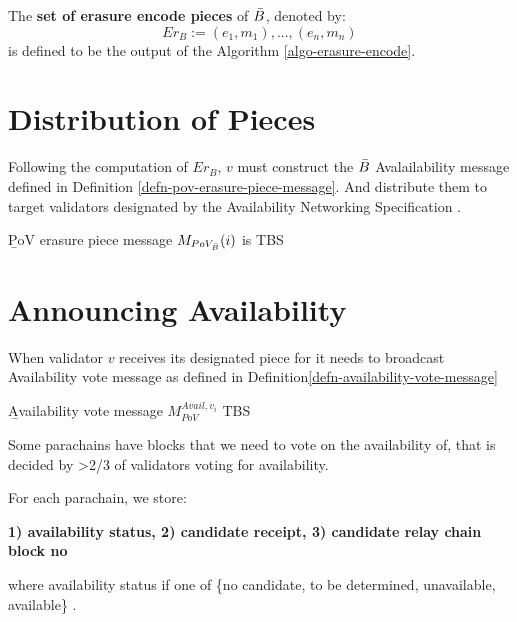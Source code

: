 \begin{definition}
  \label{defn-erasure-coded-pieces} 
  The {\bf set of erasure encode pieces} of $\bar{B}$, denoted by: 
  \[
   Er_B := {(e_1, m_1),...,(e_n,m_n)}
   \]
   is defined to be the output of the Algorithm \ref{algo-erasure-encode}.
\end{definition}

\section{Distribution of Pieces}\label{sect-distribute-piece}
Following the computation of $Er_B$, $v$ must construct the $\bar{B}$ Avalailability message defined in Definition \ref{defn-pov-erasure-piece-message}. And distribute them to target validators designated by the Availability Networking Specification \cite{??}.

\begin{definition}
  \label{defn-pov-erasure-piece-message}
        {\b PoV erasure piece message} $M_{PoV_{\bar{B}}}(i)$ is TBS
\end{definition}

\section{Announcing Availability}\label{sect-voting-on-availability}

When validator $v$ receives its designated piece for \blobB it needs to broadcast Availability vote message as defined in Definition\ref{defn-availability-vote-message}
\begin{definition}
  \label{defn-availability-vote-message} 
        {\b Availability vote message} $M_{PoV}^{Avail,v_i}$ TBS
\end{definition}


Some parachains have blocks that we need to vote on the availability of, that is decided by >2/3 of validators voting for availability. 

For each parachain, we store:

\textbf{1) availability status, 2) candidate receipt, 3) candidate relay chain block no}

where availability status if one of \{no candidate, to be determined, unavailable, available\} .

